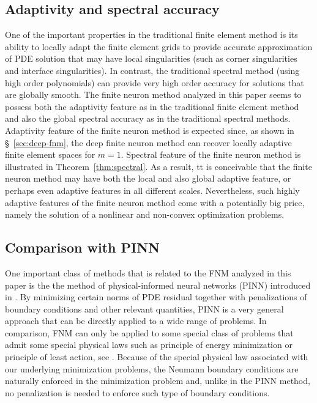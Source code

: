 \subsection{Adaptivity and spectral accuracy} 
One of the important properties in the traditional finite element
method is its ability to locally adapt the finite element grids to
provide accurate approximation of PDE solution that may have local
singularities (such as corner singularities and interface
singularities).  In contrast, the traditional spectral method (using
high order polynomials) can provide very high order accuracy for
solutions that are globally smooth.  The finite neuron method analyzed
in this paper seems to possess both the adaptivity feature as in the
traditional finite element method and also the global spectral
accuracy as in the traditional spectral methods.  Adaptivity feature
of the finite neuron method is expected since, as shown in 
\S~\ref{sec:deep-fnm},  the deep finite neuron method can recover locally
adaptive finite element spaces for $m=1$.  Spectral feature of the
finite neuron method is illustrated in Theorem~\ref{thm:spectral}.
As a result, tt is conceivable that the finite neuron method may have both the
local and also global adaptive feature, or perhaps even adaptive
features in all different scales.  Nevertheless, such highly adaptive
features of the finite neuron method come with a potentially big
price, namely the solution of a nonlinear and non-convex optimization
problems.

\subsection{Comparison with PINN}
One important class of methods that is related to the FNM analyzed in
this paper is the the method of physical-informed neural networks
(PINN) introduced in \cite{raissi2019physics}.  By minimizing
certain norms of PDE residual together with penalizations of boundary
conditions and other relevant quantities, PINN is a very general
approach that can be directly applied to a wide range of problems.  In
comparison, FNM can only be applied to some special class of problems
that admit some special physical laws such as principle of energy
minimization or principle of least action, see \cite{feynmanfeynman}.
Because of the special physical law associated with our underlying
minimization problems, the Neumann boundary conditions are naturally
enforced in the minimization problem and, unlike in the PINN method,
no penalization is needed to enforce such type of boundary conditions.

